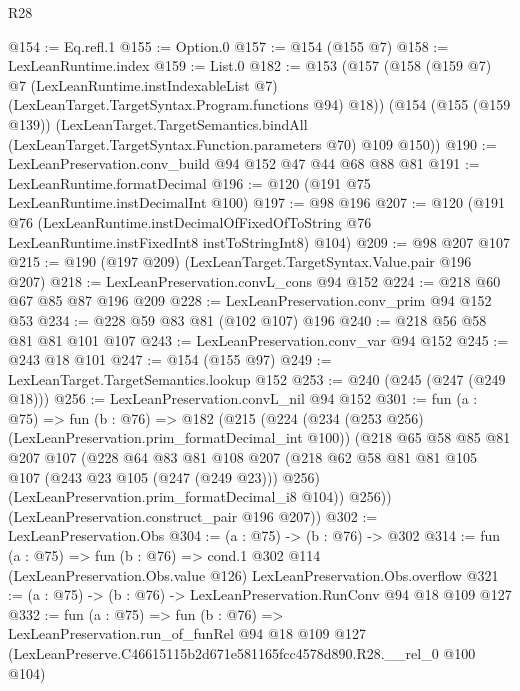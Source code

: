 \begin{lexlean}{R28}
\begin{coremodule}
@154 := Eq.refl.{1}
@155 := Option.{0}
@157 := @154 (@155 @7)
@158 := LexLeanRuntime.index
@159 := List.{0}
@182 := @153
    (@157
      (@158
        (@159 @7)
        @7
        (LexLeanRuntime.instIndexableList @7)
        (LexLeanTarget.TargetSyntax.Program.functions @94)
        @18))
    (@154
      (@155 (@159 @139))
      (LexLeanTarget.TargetSemantics.bindAll
        (LexLeanTarget.TargetSyntax.Function.parameters @70)
        @109
        @150))
@190 := LexLeanPreservation.conv_build @94 @152 @47 @44 @68 @88 @81
@191 := LexLeanRuntime.formatDecimal
@196 := @120 (@191 @75 LexLeanRuntime.instDecimalInt @100)
@197 := @98 @196
@207 := @120
    (@191
      @76
      (LexLeanRuntime.instDecimalOfFixedOfToString
        @76
        LexLeanRuntime.instFixedInt8
        instToStringInt8)
      @104)
@209 := @98 @207 @107
@215 := @190 (@197 @209) (LexLeanTarget.TargetSyntax.Value.pair @196 @207)
@218 := LexLeanPreservation.convL_cons @94 @152
@224 := @218 @60 @67 @85 @87 @196 @209
@228 := LexLeanPreservation.conv_prim @94 @152 @53
@234 := @228 @59 @83 @81 (@102 @107) @196
@240 := @218 @56 @58 @81 @81 @101 @107
@243 := LexLeanPreservation.conv_var @94 @152
@245 := @243 @18 @101
@247 := @154 (@155 @97)
@249 := LexLeanTarget.TargetSemantics.lookup @152
@253 := @240 (@245 (@247 (@249 @18)))
@256 := LexLeanPreservation.convL_nil @94 @152
@301 := fun (a : @75) =>
  fun (b : @76) =>
  @182
    (@215
      (@224
        (@234 (@253 @256) (LexLeanPreservation.prim_formatDecimal_int @100))
        (@218
          @65
          @58
          @85
          @81
          @207
          @107
          (@228
            @64
            @83
            @81
            @108
            @207
            (@218 @62 @58 @81 @81 @105 @107 (@243 @23 @105 (@247 (@249 @23))) @256)
            (LexLeanPreservation.prim_formatDecimal_i8 @104))
          @256))
      (LexLeanPreservation.construct_pair @196 @207))
@302 := LexLeanPreservation.Obs
@304 := (a : @75) -> (b : @76) -> @302
@314 := fun (a : @75) =>
  fun (b : @76) =>
  cond.{1} @302 @114 (LexLeanPreservation.Obs.value @126) LexLeanPreservation.Obs.overflow
@321 := (a : @75) -> (b : @76) -> LexLeanPreservation.RunConv @94 @18 @109 @127
@332 := fun (a : @75) =>
  fun (b : @76) =>
  LexLeanPreservation.run_of_funRel
    @94
    @18
    @109
    @127
    (LexLeanPreserve.C46615115b2d671e581165fcc4578d890.R28.__rel_0 @100 @104)
\end{coremodule}
\end{lexlean}
